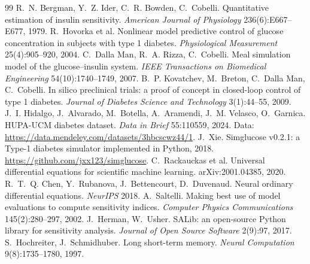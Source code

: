 \documentclass[11pt,a4paper]{article}
\begin{document}
\begin{thebibliography}{99}
 R.~N. Bergman, Y.~Z. Ider, C.~R. Bowden, C.~Cobelli. Quantitative estimation of insulin sensitivity. \emph{American Journal of Physiology} 236(6):E667--E677, 1979.
 R.~Hovorka et al. Nonlinear model predictive control of glucose concentration in subjects with type 1 diabetes. \emph{Physiological Measurement} 25(4):905--920, 2004.
 C.~Dalla Man, R.~A. Rizza, C.~Cobelli. Meal simulation model of the glucose--insulin system. \emph{IEEE Transactions on Biomedical Engineering} 54(10):1740--1749, 2007.
 B.~P. Kovatchev, M.~Breton, C.~Dalla Man, C.~Cobelli. In silico preclinical trials: a proof of concept in closed-loop control of type 1 diabetes. \emph{Journal of Diabetes Science and Technology} 3(1):44--55, 2009.
 J.~I. Hidalgo, J.~Alvarado, M.~Botella, A.~Aramendi, J.~M. Velasco, O.~Garnica. HUPA-UCM diabetes dataset. \emph{Data in Brief} 55:110559, 2024. Data: \url{https://data.mendeley.com/datasets/3hbcscwz44/1}.
 J.~Xie. Simglucose v0.2.1: a Type-1 diabetes simulator implemented in Python, 2018. \url{https://github.com/jxx123/simglucose}.
 C.~Rackauckas et al. Universal differential equations for scientific machine learning. arXiv:2001.04385, 2020.
 R.~T.~Q. Chen, Y.~Rubanova, J.~Bettencourt, D.~Duvenaud. Neural ordinary differential equations. \emph{NeurIPS} 2018.
 A.~Saltelli. Making best use of model evaluations to compute sensitivity indices. \emph{Computer Physics Communications} 145(2):280--297, 2002.
 J.~Herman, W.~Usher. SALib: an open-source Python library for sensitivity analysis. \emph{Journal of Open Source Software} 2(9):97, 2017.
 S.~Hochreiter, J.~Schmidhuber. Long short-term memory. \emph{Neural Computation} 9(8):1735--1780, 1997.
\end{thebibliography}
\end{document}

